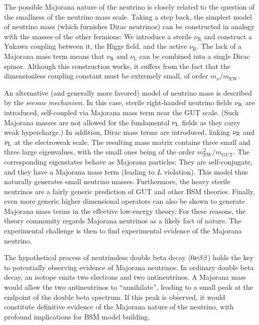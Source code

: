 \documentclass[../thesis.tex]{subfiles}
\begin{document}
The possible Majorana nature of the neutrino is closely related to the question of the smallness of the neutrino mass scale. Taking a step back, the simplest model of neutrino mass (which furnishes Dirac neutrinos) can be constructed in analogy with the masses of the other fermions: We introduce a sterile $\nu_{\text{R}}$ and construct a Yukawa coupling between it, the Higgs field, and the active $\nu_{\text{R}}$. The lack of a Majorana mass term means that $\nu_{\text{R}}$ and $\nu_{\text{L}}$ can be combined into a single Dirac spinor. Although this construction works, it suffers from the fact that the dimensionless coupling constant must be extremely small, of order $m_\nu/m_{\text{EW}}$.

An alternative (and generally more favored) model of neutrino mass is described by the \emph{seesaw mechanism}. In this case, sterile right-handed neutrino fields $\nu_{\text{R}}$ are introduced, self-coupled via Majorana mass term near the GUT scale. (Such Majorana masses are not allowed for the fundamental $\nu_{\text{L}}$ fields as they carry weak hypercharge.) In addition, Dirac mass terms are introduced, linking $\nu_{\text{R}}$ and $\nu_{\text{L}}$ at the electroweak scale. The resulting mass matrix contains three small and three large eigenvalues, with the small ones being of the order \(m^2_{\text{EW}} / m_{\text{GUT}}\). The corresponding eigenstates behave as Majorana particles: They are self-conjugate, and they have a Majorana mass term (leading to $L$ violation). This model thus naturally generates small neutrino masses. Furthermore, the heavy sterile neutrinos are a fairly generic prediction of GUT and other BSM theories. Finally, even more generic higher dimensional operators can also be shown to generate Majorana mass terms in the effective low-energy theory. For these reasons, the theory community regards Majorana neutrinos as a likely fact of nature. The experimental challenge is then to find experimental evidence of the Majorana neutrino.

The hypothetical process of neutrinoless double beta decay ($0\nu\beta\beta$) holds the key to potentially observing evidence of Majorana neutrinos. In ordinary double beta decay, an isotope emits two electrons and two antineutrinos. A Majorana mass would allow the two antineutrinos to ``annihilate'', leading to a small peak at the endpoint of the double beta spectrum. If this peak is observed, it would constitute definitive evidence of the Majorana nature of the neutrino, with profound implications for BSM model building.
\end{document}
